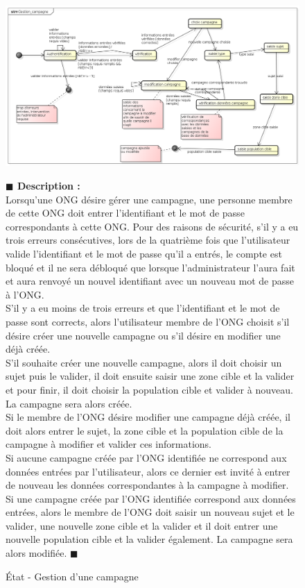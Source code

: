 \documentclass[11pt, titlepage]{report}
\newcommand{\debutDescription}{\noindent\textbf{\textcolor{DescriptionColor}{$\blacksquare$  Description : \\}}}
\newcommand{\finDescription}{\noindent\textcolor{DescriptionColor}{$\blacksquare$}}
\begin{document}
\begin{figure}[h!]
\begin{center}
\includegraphics[scale=.4]{../images/diagrammes/uml/exigence_2/etat_gestion_campagne.png} 
\caption{État - Gestion d'une campagne}
\end{center}
\debutDescription
Lorsqu'une ONG désire gérer une campagne, une personne membre de cette ONG doit entrer l'identifiant et le mot de passe correspondants à cette ONG. Pour des raisons de sécurité, s'il y a eu trois erreurs consécutives, lors de la quatrième fois que l'utilisateur valide l'identifiant et le mot de passe qu'il a entrés, le compte est bloqué et il ne sera débloqué que lorsque l'administrateur l'aura fait et aura renvoyé un nouvel identifiant avec un nouveau mot de passe à l'ONG.\\
	S'il y a eu moins de trois erreurs et que l'identifiant et le mot de passe sont corrects, alors l'utilisateur membre de l'ONG choisit s'il désire créer une nouvelle campagne ou s'il désire en modifier une déjà créée.\\
	S'il souhaite créer une nouvelle campagne, alors il doit choisir un sujet puis le valider, il doit ensuite saisir une zone cible et la valider et pour finir, il doit choisir la population cible et valider à nouveau. La campagne sera alors créée.\\
	Si le membre de l'ONG désire modifier une campagne déjà créée, il doit alors entrer le sujet, la zone cible et la population cible de la campagne à modifier et valider ces informations.\\
	Si aucune campagne créée par l'ONG identifiée ne correspond aux données entrées par l'utilisateur, alors ce dernier est invité à entrer de nouveau les données correspondantes à la campagne à modifier.\\
	Si une campagne créée par l'ONG identifiée correspond aux données entrées, alors le membre de l'ONG doit saisir un nouveau sujet et le valider, une nouvelle zone cible et la valider et il doit entrer une nouvelle population cible et la valider également. La campagne sera alors modifiée.
\finDescription
\end{figure}
\end{document}
